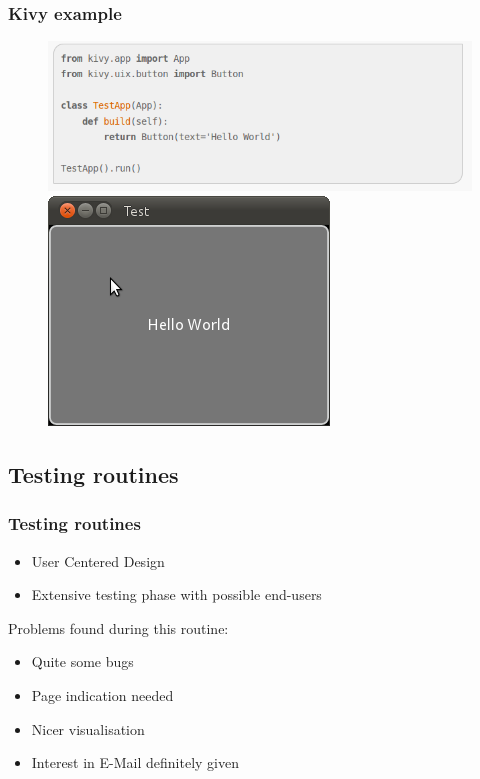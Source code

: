\documentclass[9pt]{beamer}
\begin{document}
			\begin{frame}
				\frametitle{Kivy example}
				\begin{figure}
				\centering
				\includegraphics[scale=0.3]{Images/kivy_helloworld_code.png}
				\includegraphics[scale=0.3]{Images/kivy_helloworld_result.png}
				\end{figure}
			\end{frame}
			
		\subsection{Testing routines}
			
			\begin{frame}
				\frametitle{Testing routines}
				\begin{itemize}
					\item User Centered Design
					\item Extensive testing phase with possible end-users
				\end{itemize}
				Problems found during this routine:
				\begin{itemize}
					\item Quite some bugs
					\item Page indication needed
					\item Nicer visualisation
					\item Interest in E-Mail definitely given
				\end{itemize}
			\end{frame}
			
\end{document}
